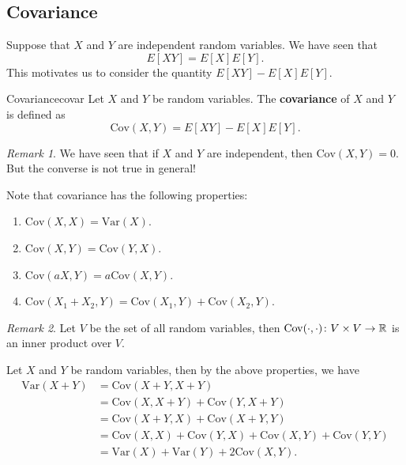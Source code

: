 \documentclass[math]{amznotes}
\theoremstyle{remark}
\newtheorem*{remark}{Remark}
\begin{document}
\subsection{Covariance}
Suppose that $X$ and $Y$ are independent random variables. We have seen that
\begin{equation*}
    E[XY] = E[X]E[Y].
\end{equation*}
This motivates us to consider the quantity $E[XY] - E[X]E[Y]$.
\begin{dfnbox}{Covariance}{covar}
    Let $X$ and $Y$ be random variables. The {\color{red} \textbf{covariance}} of $X$ and $Y$ is defined as
    \begin{equation*}
        \mathrm{Cov}(X, Y) = E[XY] - E[X]E[Y].
    \end{equation*}
\end{dfnbox}
\begin{notebox}
    \begin{remark}
        We have seen that if $X$ and $Y$ are independent, then $\mathrm{Cov}(X, Y) = 0$. But the converse is not true in general!
    \end{remark}
\end{notebox}
Note that covariance has the following properties:
\begin{enumerate}
    \item $\mathrm{Cov}(X, X) = \mathrm{Var}(X)$.
    \item $\mathrm{Cov}(X, Y) = \mathrm{Cov}(Y, X)$.
    \item $\mathrm{Cov}(aX, Y) = a\mathrm{Cov}(X, Y)$.
    \item $\mathrm{Cov}(X_1 + X_2, Y) = \mathrm{Cov}(X_1, Y) + \mathrm{Cov}(X_2, Y)$.
\end{enumerate}
\begin{notebox}
    \begin{remark}
        Let $V$ be the set of all random variables, then $\mathrm{Cov}(\cdot, \cdot) \colon V \times V \to \mathbb{R}$ is an inner product over $V$.
    \end{remark}
\end{notebox}
Let $X$ and $Y$ be random variables, then by the above properties, we have
\begin{align*}
    \mathrm{Var}(X + Y) & = \mathrm{Cov}(X + Y, X + Y) \\
    & = \mathrm{Cov}(X, X + Y) + \mathrm{Cov}(Y, X + Y) \\
    & = \mathrm{Cov}(X + Y, X) + \mathrm{Cov}(X + Y, Y) \\
    & = \mathrm{Cov}(X, X) + \mathrm{Cov}(Y, X) + \mathrm{Cov}(X, Y) + \mathrm{Cov}(Y, Y) \\
    & = \mathrm{Var}(X) + \mathrm{Var}(Y) + 2\mathrm{Cov}(X, Y).
\end{align*}
\end{document}
